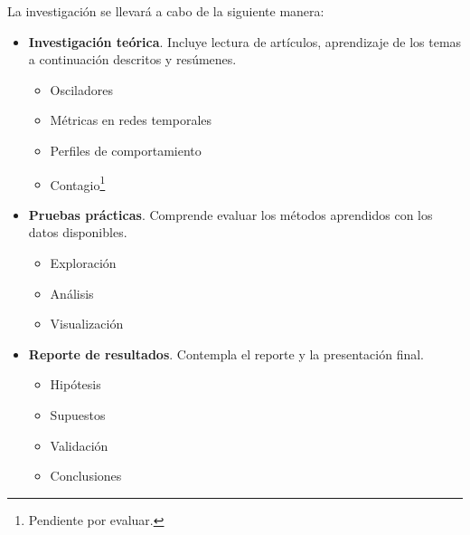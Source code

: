 \documentclass[10pt]{article}
\begin{document}
La investigación se llevará a cabo de la siguiente manera:

\begin{itemize}
 \item {\bf Investigación teórica}. Incluye lectura de artículos, aprendizaje
  de los temas a continuación descritos y resúmenes.
  \begin{itemize}
   \item Osciladores
   \item Métricas en redes temporales
   \item Perfiles de comportamiento 
   \item Contagio\footnote{Pendiente por evaluar.}
  \end{itemize}
 \item {\bf Pruebas prácticas}. Comprende evaluar los métodos aprendidos con
 los datos disponibles.
  \begin{itemize}
   \item Exploración
   \item Análisis
   \item Visualización
  \end{itemize}
 \item {\bf Reporte de resultados}. Contempla el reporte y la presentación final.
  \begin{itemize}
   \item Hipótesis
   \item Supuestos
   \item Validación
   \item Conclusiones
  \end{itemize}
\end{itemize}




% 
% 
\end{document}
